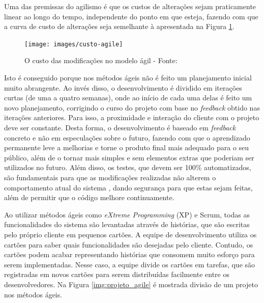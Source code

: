 Uma das premissas do agilismo é que os custos de alterações sejam praticamente linear ao longo do tempo, independente do ponto em que esteja, fazendo com que a curva de custo de alterações seja semelhante à apresentada na Figura \ref{img:custo-agile}.

\begin{figure}[h]
  \center
  \caption{O custo das modificações no modelo ágil - Fonte: \cite{XPKent}}
  \texttt{[image: images/custo-agile]}
  \label{img:custo-agile}
\end{figure}

Isto é conseguido porque nos métodos ágeis não é feito um planejamento inicial muito abrangente. Ao invés disso, o desenvolvimento é dividido em iterações curtas (de uma a quatro semanas), onde ao início de cada uma delas é feito um novo planejamento, corrigindo o curso do projeto com base no \textit{feedback} obtido nas iterações anteriores. Para isso, a proximidade e interação do cliente com o projeto deve ser constante. Desta forma, o desenvolvimento é baseado em \textit{feedback} concreto e não em especulações sobre o futuro, fazendo com que o aprendizado permanente leve a melhorias e torne o produto final mais adequado para o seu público, além de o tornar mais simples e sem elementos extras que poderiam ser utilizados no futuro. Além disso, os testes, que devem ser 100\% automatizados, são fundamentais para que as modificações realizadas não alterem o comportamento atual do sistema  \cite{XPKent}, dando segurança para que estas sejam feitas, além de permitir que o código melhore continuamente.

Ao utilizar métodos ágeis como \textit{eXtreme Programming} (XP)  e Scrum, todas as funcionalidades do sistema são levantadas através de histórias, que são escritas pelo próprio cliente em pequenos cartões. A equipe de desenvolvimento utiliza os cartões para saber quais funcionalidades são desejadas pelo cliente. Contudo, os cartões podem acabar representando histórias que consomem muito esforço para serem implementadas. Nesse caso, a equipe divide os cartões em tarefas, que são registradas em novos cartões para serem distribuídas facilmente entre os desenvolvedores. Na Figura \ref{img:projeto_agile} é mostrada divisão de um projeto nos métodos ágeis.


